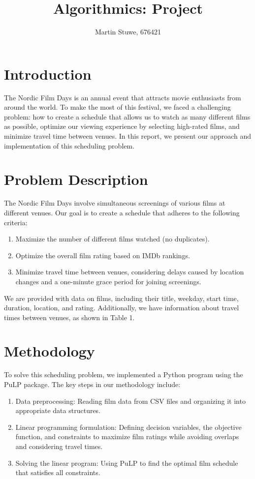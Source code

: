 \documentclass{article}
\title{Algorithmics: Project}
\author{Martin Stuwe, 676421}
\begin{document}
\maketitle

\section{Introduction}
The Nordic Film Days is an annual event that attracts movie enthusiasts from around the world. To make the most of this festival, we faced a challenging problem: how to create a schedule that allows us to watch as many different films as possible, optimize our viewing experience by selecting high-rated films, and minimize travel time between venues. In this report, we present our approach and implementation of this scheduling problem.
\section{Problem Description}
The Nordic Film Days involve simultaneous screenings of various films at different venues. Our goal is to create a schedule that adheres to the following criteria:
\begin{enumerate}
\item Maximize the number of different films watched (no duplicates).
\item Optimize the overall film rating based on IMDb rankings.
\item Minimize travel time between venues, considering delays caused by location changes and a one-minute grace period for joining screenings.
\end{enumerate}
We are provided with data on films, including their title, weekday, start time, duration, location, and rating. Additionally, we have information about travel times between venues, as shown in Table 1.


\section{Methodology}
To solve this scheduling problem, we implemented a Python program using the PuLP package. The key steps in our methodology include:
\begin{enumerate}
\item Data preprocessing: Reading film data from CSV files and organizing it into appropriate data structures.
\item Linear programming formulation: Defining decision variables, the objective function, and constraints to maximize film ratings while avoiding overlaps and considering travel times.
\item Solving the linear program: Using PuLP to find the optimal film schedule that satisfies all constraints.
\end{enumerate}
\end{document}
